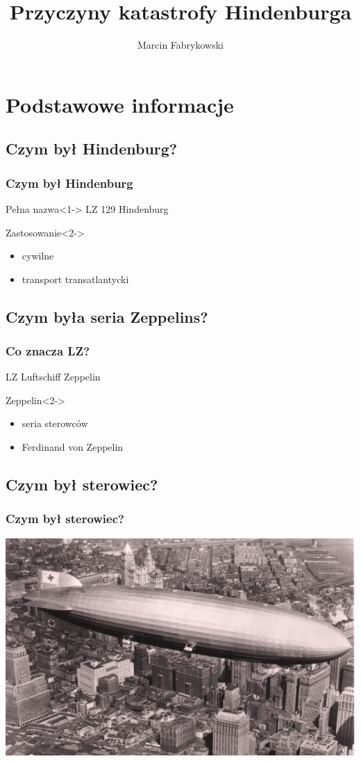 \documentclass{beamer}
\author{Marcin Fabrykowski}
\title{Przyczyny katastrofy Hindenburga}
\begin{document}
\begin{frame}
\maketitle
\end{frame}
\section{Podstawowe informacje}
\subsection{Czym był Hindenburg?}
\begin{frame}
	\frametitle{Czym był Hindenburg}
	\begin{block}{Pełna nazwa}<1->
		LZ 129 Hindenburg
	\end{block}
	\begin{block}{Zastosowanie}<2->
		\begin{itemize}
			\item cywilne
			\item transport transatlantycki
		\end{itemize}
	\end{block}
\end{frame}
\subsection{Czym była seria Zeppelins?}
\begin{frame}
	\frametitle{Co znacza LZ?}
	\begin{block}{LZ}
		Luftschiff Zeppelin
	\end{block}
		\begin{block}{Zeppelin}<2->
		\begin{itemize}
			\item<3-> seria sterowców
			\item<4-> Ferdinand von Zeppelin
		\end{itemize}
	\end{block}
\end{frame}
\subsection{Czym był sterowiec?}
\begin{frame}
	\frametitle{Czym był sterowiec?}
	\includegraphics[width=0.8\paperwidth]{Hindenburg}
\end{frame}
\end{document}
